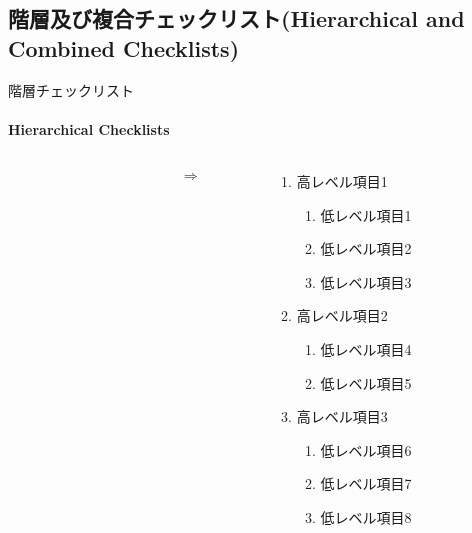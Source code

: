 \subsection{階層及び複合チェックリスト(Hierarchical and Combined Checklists)}
\begin{frame}{階層チェックリスト}
\framesubtitle{Hierarchical Checklists }
\begin{columns}
    \begin{column}{0.3\textwidth}
    \end{column}
    \begin{column}{0.1\textwidth}
    \Huge\[\Rightarrow\]
    \end{column}
    \begin{column}{0.5\textwidth}
    \begin{enumerate}
    \item 高レベル項目1
        \begin{enumerate}
        \item 低レベル項目1
        \item 低レベル項目2
        \item 低レベル項目3
        \end{enumerate}
    \item 高レベル項目2
        \begin{enumerate}
        \item 低レベル項目4
        \item 低レベル項目5
        \end{enumerate}
    \item 高レベル項目3
        \begin{enumerate}
        \item 低レベル項目6
        \item 低レベル項目7
        \item 低レベル項目8
        \end{enumerate}
    \end{enumerate}
    \end{column}
\end{columns}
\end{frame}
